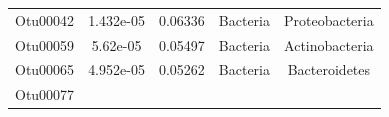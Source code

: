 \documentclass[]{article}
\begin{document}
\begin{longtable}[]{@{}ccccc@{}}
\begin{minipage}[t]{0.13\columnwidth}
Otu00042\strut
\end{minipage} & \begin{minipage}[t]{0.14\columnwidth}\centering\strut
1.432e-05\strut
\end{minipage} & \begin{minipage}[t]{0.12\columnwidth}\centering\strut
0.06336\strut
\end{minipage} & \begin{minipage}[t]{0.13\columnwidth}\centering\strut
Bacteria\strut
\end{minipage} & \begin{minipage}[t]{0.20\columnwidth}\centering\strut
Proteobacteria\strut
\end{minipage}\tabularnewline
\begin{minipage}[t]{0.13\columnwidth}\centering\strut
Otu00059\strut
\end{minipage} & \begin{minipage}[t]{0.14\columnwidth}\centering\strut
5.62e-05\strut
\end{minipage} & \begin{minipage}[t]{0.12\columnwidth}\centering\strut
0.05497\strut
\end{minipage} & \begin{minipage}[t]{0.13\columnwidth}\centering\strut
Bacteria\strut
\end{minipage} & \begin{minipage}[t]{0.20\columnwidth}\centering\strut
Actinobacteria\strut
\end{minipage}\tabularnewline
\begin{minipage}[t]{0.13\columnwidth}\centering\strut
Otu00065\strut
\end{minipage} & \begin{minipage}[t]{0.14\columnwidth}\centering\strut
4.952e-05\strut
\end{minipage} & \begin{minipage}[t]{0.12\columnwidth}\centering\strut
0.05262\strut
\end{minipage} & \begin{minipage}[t]{0.13\columnwidth}\centering\strut
Bacteria\strut
\end{minipage} & \begin{minipage}[t]{0.20\columnwidth}\centering\strut
Bacteroidetes\strut
\end{minipage}\tabularnewline
\begin{minipage}[t]{0.13\columnwidth}\centering\strut
Otu00077\strut
\end{minipage} & \begin{minipage}[t]{0.14\columnwidth}\centering\strut

\end{minipage}
\end{longtable}
\end{document}
